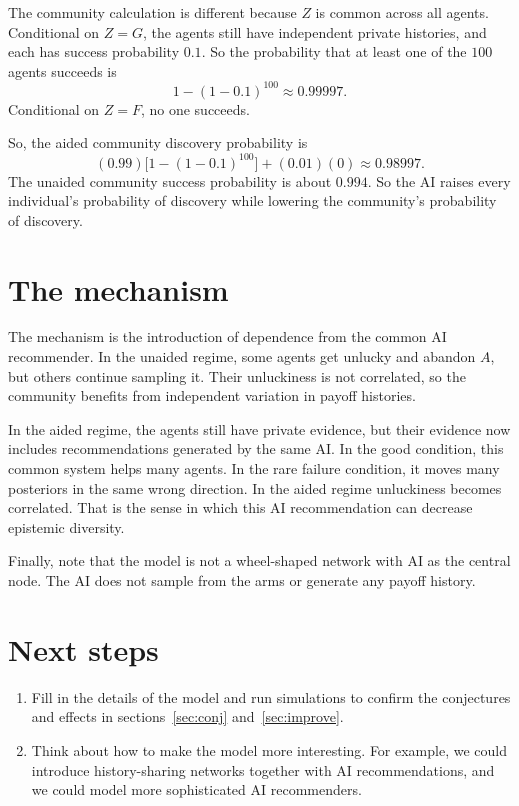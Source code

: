 \documentclass[12pt]{article}
\begin{document}
The community calculation is different because $Z$ is common across all agents.
Conditional on $Z = G$, the agents still have independent private histories, and each has success probability $0.1$.
So the probability that at least one of the $100$ agents succeeds is
\[
  1 - (1 - 0.1)^{100} \approx 0.99997.
\]
Conditional on $Z = F$, no one succeeds.

So, the aided community discovery probability is
\[
  (0.99)\bigl[1 - (1 - 0.1)^{100}\bigr] + (0.01)(0) \approx 0.98997.
\]
The unaided community success probability is about $0.994$.
So the AI raises every individual's probability of discovery while lowering the community's probability of discovery.

\section{The mechanism}
\label{sec:mech}

The mechanism is the introduction of dependence from the common AI recommender.
In the unaided regime, some agents get unlucky and abandon $A$, but others continue sampling it.
Their unluckiness is not correlated, so the community benefits from independent variation in payoff histories.

In the aided regime, the agents still have private evidence, but their evidence now includes recommendations generated by the same AI.
In the good condition, this common system helps many agents.
In the rare failure condition, it moves many posteriors in the same wrong direction.
In the aided regime unluckiness becomes correlated.
That is the sense in which this AI recommendation can decrease epistemic diversity.

Finally, note that the model is not a wheel-shaped network with AI as the central node.
The AI does not sample from the arms or generate any payoff history.

\section{Next steps}
\label{sec:next}

\begin{enumerate}[leftmargin=*]
  \item Fill in the details of the model and run simulations to confirm the conjectures and effects in sections~\ref{sec:conj} and~\ref{sec:improve}.
  \item Think about how to make the model more interesting.
    For example, we could introduce history-sharing networks together with AI recommendations, and we could model more sophisticated AI recommenders.
\end{enumerate}
\end{document}
